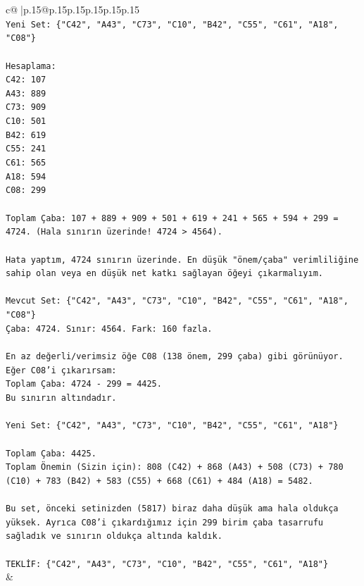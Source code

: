 \documentclass{article}
\begin{document}
{\begin{supertabular}{c@{$\;$}|p{.15\linewidth}@{}p{.15\linewidth}p{.15\linewidth}p{.15\linewidth}p{.15\linewidth}p{.15\linewidth}}
{{{\\ 
\texttt{Yeni Set: \{"C42", "A43", "C73", "C10", "B42", "C55", "C61", "A18", "C08"\}} \\
\\ 
\texttt{Hesaplama:} \\
\texttt{C42: 107} \\
\texttt{A43: 889} \\
\texttt{C73: 909} \\
\texttt{C10: 501} \\
\texttt{B42: 619} \\
\texttt{C55: 241} \\
\texttt{C61: 565} \\
\texttt{A18: 594} \\
\texttt{C08: 299} \\
\\ 
\texttt{Toplam Çaba: 107 + 889 + 909 + 501 + 619 + 241 + 565 + 594 + 299 = 4724. (Hala sınırın üzerinde! 4724 > 4564).} \\
\\ 
\texttt{Hata yaptım, 4724 sınırın üzerinde. En düşük "önem/çaba" verimliliğine sahip olan veya en düşük net katkı sağlayan öğeyi çıkarmalıyım.} \\
\\ 
\texttt{Mevcut Set: \{"C42", "A43", "C73", "C10", "B42", "C55", "C61", "A18", "C08"\}} \\
\texttt{Çaba: 4724. Sınır: 4564. Fark: 160 fazla.} \\
\\ 
\texttt{En az değerli/verimsiz öğe C08 (138 önem, 299 çaba) gibi görünüyor. Eğer C08'i çıkarırsam:} \\
\texttt{Toplam Çaba: 4724 {-} 299 = 4425.} \\
\texttt{Bu sınırın altındadır.} \\
\\ 
\texttt{Yeni Set: \{"C42", "A43", "C73", "C10", "B42", "C55", "C61", "A18"\}} \\
\\ 
\texttt{Toplam Çaba: 4425.} \\
\texttt{Toplam Önemin (Sizin için): 808 (C42) + 868 (A43) + 508 (C73) + 780 (C10) + 783 (B42) + 583 (C55) + 668 (C61) + 484 (A18) = 5482.} \\
\\ 
\texttt{Bu set, önceki setinizden (5817) biraz daha düşük ama hala oldukça yüksek. Ayrıca C08'i çıkardığımız için 299 birim çaba tasarrufu sağladık ve sınırın oldukça altında kaldık.} \\
\\ 
\texttt{TEKLİF: \{"C42", "A43", "C73", "C10", "B42", "C55", "C61", "A18"\}} \\
            }
        }
    }
    & \\ \\


\end{supertabular}}
\end{document}
